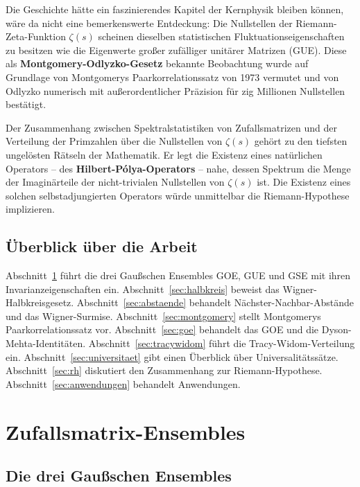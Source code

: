 \documentclass[12pt,a4paper]{amsart}
\theoremstyle{definition}
\theoremstyle{remark}
\begin{document}
Die Geschichte hätte ein faszinierendes Kapitel der Kernphysik bleiben können,
wäre da nicht eine bemerkenswerte Entdeckung: Die Nullstellen der
Riemann-Zeta-Funktion $\zeta(s)$ scheinen dieselben statistischen Fluktuationseigenschaften
zu besitzen wie die Eigenwerte großer zufälliger unitärer Matrizen (GUE).
Diese als \textbf{Montgomery-Odlyzko-Gesetz} bekannte Beobachtung wurde
auf Grundlage von Montgomerys Paarkorrelationssatz von 1973 \cite{Montgomery1973}
vermutet und von Odlyzko \cite{Odlyzko1987, Odlyzko2001} numerisch mit
außerordentlicher Präzision für zig Millionen Nullstellen bestätigt.

Der Zusammenhang zwischen Spektralstatistiken von Zufallsmatrizen und der
Verteilung der Primzahlen über die Nullstellen von $\zeta(s)$ gehört zu den
tiefsten ungelösten Rätseln der Mathematik. Er legt die Existenz eines
natürlichen Operators -- des \textbf{Hilbert-Pólya-Operators} -- nahe,
dessen Spektrum die Menge der Imaginärteile der nicht-trivialen Nullstellen
von $\zeta(s)$ ist. Die Existenz eines solchen selbstadjungierten Operators
würde unmittelbar die Riemann-Hypothese implizieren.

\subsection*{Überblick über die Arbeit}
Abschnitt~\ref{sec:ensembles} führt die drei Gaußschen Ensembles GOE, GUE
und GSE mit ihren Invarianzeigenschaften ein. Abschnitt~\ref{sec:halbkreis}
beweist das Wigner-Halbkreisgesetz. Abschnitt~\ref{sec:abstaende} behandelt
Nächster-Nachbar-Abstände und das Wigner-Surmise.
Abschnitt~\ref{sec:montgomery} stellt Montgomerys Paarkorrelationssatz vor.
Abschnitt~\ref{sec:goe} behandelt das GOE und die Dyson-Mehta-Identitäten.
Abschnitt~\ref{sec:tracywidom} führt die Tracy-Widom-Verteilung ein.
Abschnitt~\ref{sec:universitaet} gibt einen Überblick über Universalitätssätze.
Abschnitt~\ref{sec:rh} diskutiert den Zusammenhang zur Riemann-Hypothese.
Abschnitt~\ref{sec:anwendungen} behandelt Anwendungen.

\section{Zufallsmatrix-Ensembles}
\label{sec:ensembles}

\subsection{Die drei Gaußschen Ensembles}
\end{document}
